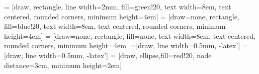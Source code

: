 = [draw, rectangle, line width=2mm, fill=green!20, text width=8em, text centered, rounded corners, minimum height=4em]
 = [draw=none, rectangle, fill=blue!20, text width=8em, text centered, rounded corners, minimum height=4em]
 = [draw=none, rectangle, fill=none, text width=8em, text centered, rounded corners, minimum height=4em]
 =[draw, line width=0.5mm, -latex']
 =[draw, line width=0.5mm, -latex']
 = [draw, ellipse,fill=red!20, node distance=3cm, minimum height=2em]
